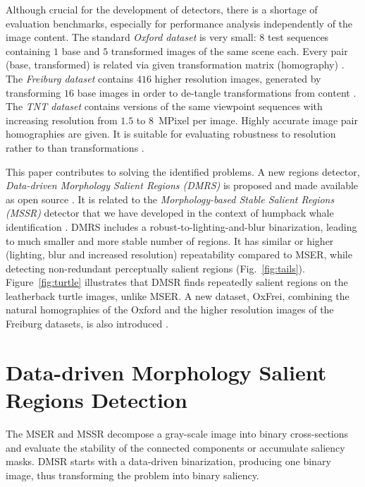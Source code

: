 \documentclass{article}
\begin{document}
Although crucial for the development of detectors, there is a shortage of evaluation benchmarks, especially for performance analysis independently of the image content. The standard {\em Oxford dataset} is very small: $8$ test sequences containing $1$ base and $5$ transformed images of the same scene each. Every pair (base, transformed) is related via given transformation matrix (homography) \cite{Mikolajczyk:2005}.  The {\em Freiburg dataset} contains $416$ higher resolution images, generated by transforming $16$ base images in order to de-tangle transformations from content \cite{FischerDB14}.  
The {\em TNT dataset} contains versions of the same viewpoint sequences with increasing resolution from $1.5$ to $8$~MPixel per image. Highly accurate image pair homographies are given. It is suitable for evaluating robustness to resolution rather to than transformations \cite{CorRos2013}. 

This paper contributes to solving the identified problems. A new regions detector, {\em Data-driven Morphology Salient Regions (DMRS)} is proposed and made available as open source \cite{Rang:software}. It is related to the {\em Morphology-based Stable Salient Regions (MSSR)} detector that we have developed in the context of humpback whale identification \cite{RangMSSR06, RangHumpb06}. DMRS includes a robust-to-lighting-and-blur binarization, leading to much smaller and more stable number of regions. It has similar or higher (lighting, blur and increased resolution) repeatability compared to MSER, while detecting non-redundant perceptually salient regions (Fig.~\ref{fig:tails}). Figure~\ref{fig:turtle} illustrates that DMSR finds repeatedly salient regions on the leatherback turtle images, unlike MSER. A new dataset, OxFrei, combining the natural homographies of the Oxford and the higher resolution images of the Freiburg datasets, is also introduced \cite{Rang:dataset}.

\section{Data-driven Morphology Salient Regions Detection}
\label{sec:DMSR}

The MSER and MSSR decompose a gray-scale image into binary cross-sections and evaluate the stability of the connected components or accumulate saliency masks. DMSR starts with a data-driven binarization, producing one binary image, thus transforming the problem into binary saliency.
\end{document}
